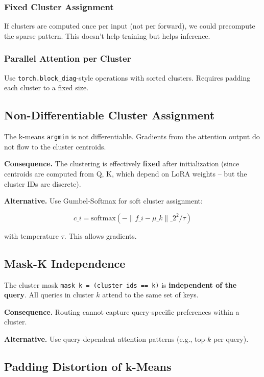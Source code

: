 \subsubsection{Fixed Cluster Assignment}

If clusters are computed once per input (not per forward), we could 
precompute the sparse pattern. This doesn't help training but helps inference.

\subsubsection{Parallel Attention per Cluster}

Use \texttt{torch.block\_diag}-style operations with sorted clusters. Requires 
padding each cluster to a fixed size.

\subsection{Non-Differentiable Cluster Assignment}

The k-means \texttt{argmin} is not differentiable. Gradients from the attention 
output do not flow to the cluster centroids.

\textbf{Consequence.} The clustering is effectively \textbf{fixed} after initialization 
(since centroids are computed from Q, K, which depend on LoRA weights -- 
but the cluster IDs are discrete).

\textbf{Alternative.} Use Gumbel-Softmax for soft cluster assignment:

\[
c\_i = \text{softmax}(-\|f\_i - \mu\_k\|\_2^2 / \tau)
\tag{8.1}
\]

with temperature $\tau$. This allows gradients.

\subsection{Mask-K Independence}

The cluster mask \texttt{mask\_k = (cluster\_ids == k)} is \textbf{independent of the query}. 
All queries in cluster $k$ attend to the same set of keys.

\textbf{Consequence.} Routing cannot capture query-specific preferences within a 
cluster.

\textbf{Alternative.} Use query-dependent attention patterns (e.g., top-$k$ per 
query).

\subsection{Padding Distortion of k-Means}

